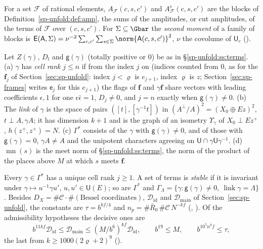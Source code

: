 \begin{definition}\label{sp-remain:def:block}
For a set $\mathcal F$ of rational elements, $A_{\mathcal F}(c,s,c')$ and $A^\flat_{\mathcal F}(c,s,c')$
are the blocks of Definition~\ref{sp-unfold:def:amp}, the sums of the amplitudes, or cut amplitudes,
of the terms of $\mathcal F$ over $(c,s,c')$. For $\Sigma\subseteq\Gbar$ the \emph{second moment} of a family of blocks is
$\mathsf E(\mathsf A,\Sigma)=\nu^{-2}\sum_{c,c'}\sum_{s\in\Sigma}\norm{\mathsf A(c,s,c')}^2$, $\nu$ the
covolume of $\mathsf U_c$ ().
\end{definition}

\begin{definition}\label{sp-remain:def:frame}
Let $Z(\gamma)$, $D_l$ and $\mathsf g(\gamma)$ (totally positive or $0$) be as in
\S\ref{sp-unfold:ss:terms}. (a) $\gamma$ has
\emph{cell rank} $j\le n$ if from the index $j$ on (indices counted from $0$, as for the $\mathbf f_j$ of
Section~\ref{sec:sp-unfold}: index $j<\varrho$ is $e_{j+1}$, index $\varrho$ is $z$; Section~\ref{sec:sp-frames}
writes $\mathsf e_j$ for this $e_{j+1}$) the flags of $\mathbf f$ and $\gamma\mathbf f$
share vectors with leading coefficients $\epsilon,1$ for one $\epsilon\bar\epsilon=1$, $D_j\ne0$, and $j=n$
exactly when $\mathsf g(\gamma)\ne0$. (b) The \emph{link} of $\gamma$ is the space of pairs
$([t],[\gamma^{-1}t])$ in $(A^\perp/A)^2=(X_0\oplus Ez)^2$, $t\perp A,\gamma A$; it has dimension
$k+1$ and is the graph of an isometry $\Upsilon_\gamma$ of $X_0\perp Ez^+$, $h(z^+,z^+)=N$. (c) $\Gamma^*$ consists of the
$\gamma$ with $\mathsf g(\gamma)\ne0$, and of those with $\mathsf g(\gamma)=0$, $\gamma A\ne A$ and
the unipotent characters agreeing on $\mathsf U\cap\gamma\mathsf U\gamma^{-1}$. (d) $\operatorname{mn}(s)$ is the meet norm of
\S\ref{sp-unfold:ss:terms}, the norm of the product of the places above $M$ at which $s$ meets $\mathbf f$.
\end{definition}

Every $\gamma\in\Gamma^*$ has a unique cell rank $j\ge1$. A set of terms is \emph{stable} if it is
invariant under $\gamma\mapsto u^{-1}\gamma u'$, $u,u'\in\mathsf U(E)$; so are $\Gamma^*$ and
$\Gamma_\Lambda=\{\gamma:\mathsf g(\gamma)\ne0,\ \operatorname{link}\gamma=\Lambda\}$. Besides $D_X=\#\mathcal C\cdot\#(\text{Bessel coordinates})$, $\mathcal D_{\mathrm{id}}$ and
$\mathcal D_{\mathrm{main}}$ of Section~\ref{sec:sp-unfold}, the constants are $\tau=b^{kf/4}$ and
$n_p=\#\bar R_0\,\#\mathcal C\,N^{-kf}$ (, ).
Of the admissibility hypotheses the decisive ones are
\begin{equation}\label{sp-remain:eq:ratio}
b^{11kf}\mathcal D_{\mathrm{id}}\le\mathcal D_{\mathrm{main}}\le(M/b^6)^{kf}\mathcal D_{\mathrm{id}},
\qquad b^{19}\le M,\qquad b^{10^5n^9f}\le\tau,
\end{equation}
the last from $k\ge1000(2\varrho+2)^9$ ().

